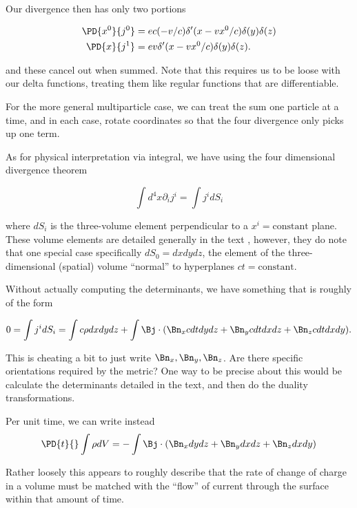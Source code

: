 {Our divergence then has only two portions

\begin{equation}\label{eqn:relElectroDynProblemSet3:2060}
\begin{aligned}
\PD{x^0}{j^0} &= e c (-v/c) \delta'(x - v x^0/c) \delta(y) \delta(z) \\
\PD{x}{j^1} &= e v \delta'(x - v x^0/c) \delta(y) \delta(z).
\end{aligned}
\end{equation}

and these cancel out when summed.  Note that this requires us to be loose with our delta functions, treating them like regular functions that are differentiable.

For the more general multiparticle case, we can treat the sum one particle at a time, and in each case, rotate coordinates so that the four divergence only picks up one term.

As for physical interpretation via integral, we have using the four dimensional divergence theorem

\begin{equation}\label{eqn:relElectroDynProblemSet3:2080}
\int d^4 x \partial_i j^i = \int j^i dS_i
\end{equation}

where $dS_i$ is the three-volume element perpendicular to a $x^i = \text{constant}$ plane.  These volume elements are detailed generally in the text \citep{landau1980classical}, however, they do note that one special case specifically $dS_0 = dx dy dz$, the element of the three-dimensional (spatial) volume ``normal'' to hyperplanes $ct = \text{constant}$.

Without actually computing the determinants, we have something that is roughly of the form

\begin{equation}\label{eqn:relElectroDynProblemSet3:2100}
0 
= \int j^i dS_i
=
\int c \rho dx dy dz
+\int \Bj \cdot (\Bn_x c dt dy dz + \Bn_y c dt dx dz + \Bn_z c dt dx dy).
\end{equation}

This is cheating a bit to just write $\Bn_x, \Bn_y, \Bn_z$.  Are there specific orientations required by the metric?  One way to be precise about this would be calculate the determinants detailed in the text, and then do the duality transformations.

Per unit time, we can write instead
\begin{equation}\label{eqn:relElectroDynProblemSet3:2120}
\PD{t}{} \int \rho dV
= -\int \Bj \cdot (\Bn_x dy dz + \Bn_y dx dz + \Bn_z dx dy)
\end{equation}

Rather loosely this appears to roughly describe that the rate of change of charge in a volume must be matched with the ``flow'' of current through the surface within that amount of time.

}
